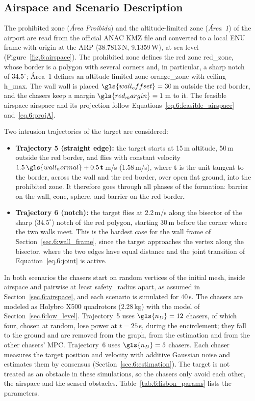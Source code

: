 \subsection{Airspace and Scenario Description} \label{sec.6:lisbon_setup}

The prohibited zone (\emph{\'Area Proibida}) and the altitude-limited zone (\emph{\'Area~1}) of the airport are read from the official \gls{ANAC} \gls{KMZ} file and converted to a local \gls{ENU} frame with origin at the \gls{ARP} (38.7813\,N, 9.1359\,W), at sea level (Figure~\ref{fig.6:airspace}). The prohibited zone defines the red zone \gls{red_zone}, whose border is a polygon with several corners and, in particular, a sharp notch of $34.5^\circ$; \'Area~1 defines an altitude-limited zone \gls{orange_zone} with ceiling \gls{h_max}. The wall \gls{wall} is placed $\gls{wall_offset}=30$\,m outside the red border, and the chasers keep a margin $\gls{red_margin}=1$\,m to it. The feasible airspace \gls{airspace} and its projection follow Equations~\eqref{eq.6:feasible_airspace} and~\eqref{eq.6:projA}.

Two intrusion trajectories of the target are considered:
\begin{itemize}
    \item \textbf{Trajectory 5 (straight edge):} the target starts at 15\,m altitude, 50\,m outside the red border, and flies with constant velocity $1.5\,\gls{wall_normal}+0.5\,\mathbf{t}$\,m/s (1.58\,m/s), where $\mathbf{t}$ is the unit tangent to the border, across the wall and the red border, over open flat ground, into the prohibited zone. It therefore goes through all phases of the formation: barrier on the wall, cone, sphere, and barrier on the red border.
    \item \textbf{Trajectory 6 (notch):} the target flies at 2.2\,m/s along the bisector of the sharp ($34.5^\circ$) notch of the red polygon, starting 30\,m before the corner where the two walls meet. This is the hardest case for the wall frame of Section~\ref{sec.6:wall_frame}, since the target approaches the vertex along the bisector, where the two edges have equal distance and the joint transition of Equation~\eqref{eq.6:joint} is active.
\end{itemize}

In both scenarios the chasers start on random vertices of the initial mesh, inside \gls{airspace} and pairwise at least \gls{safety_radius} apart, as assumed in Section~\ref{sec.6:airspace}, and each scenario is simulated for 40\,s. The chasers are modeled as Holybro X500 quadrotors (2.28\,kg) with the model of Section~\ref{sec.6:low_level}. Trajectory~5 uses $\gls{n_D}=12$ chasers, of which four, chosen at random, lose power at $t=25$\,s, during the encirclement; they fall to the ground and are removed from the graph, from the estimation and from the other chasers' \gls{MPC}. Trajectory~6 uses $\gls{n_D}=5$ chasers. Each chaser measures the target position and velocity with additive Gaussian noise and estimates them by consensus (Section~\ref{sec.6:estimation}). The target is not treated as an obstacle in these simulations, so the chasers only avoid each other, the airspace and the sensed obstacles. Table~\ref{tab.6:lisbon_params} lists the parameters.

